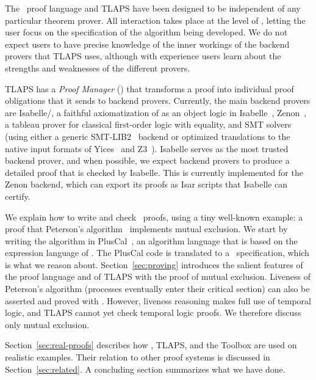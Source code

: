 \documentclass[a4paper,draft]{llncs}
\begin{document}
The \tlaplus\ proof language and TLAPS have been designed to be independent of
any particular theorem prover. All interaction takes place at the level of
\tlaplus, letting the user focus on the specification of the algorithm being
developed. We do not expect users to have precise knowledge of the inner
workings of the backend provers that TLAPS uses, although with experience users
learn about the strengths and weaknesses of the different provers.

TLAPS has a \emph{Proof Manager} (\PM) that transforms a proof into
individual proof obligations that it sends to backend provers.
Currently, the main backend provers are Isabelle/\tlaplus, a faithful
axiomatization of \tlaplus as an object logic in Isabelle~\cite{wenzel:isabelle},
Zenon~\cite{bonichon07lpar}, a tableau prover for classical
first-order logic with equality, and SMT solvers (using either a generic
SMT-LIB2~\cite{smtlib} backend or optimized translations to the native input
formats of Yices~\cite{yices} and Z3~\cite{z3}).
Isabelle serves as
the most trusted backend prover, and when possible, we expect backend provers to
produce a detailed proof that is checked by Isabelle. This is currently
implemented for the Zenon backend, which can export its proofs as Isar
scripts that Isabelle can certify.

We explain how to write and check \tlaplus\ proofs,
using a tiny well-known example: a proof that Peterson's
algorithm~\cite{peterson:myths} implements
mutual exclusion. We start by writing the algorithm in
PlusCal~\cite{lamport:pluscal}, an algorithm language that is based on the
expression language of \tlaplus. The PlusCal code is translated to a \tlaplus\
specification, which is what we reason about. Section~\ref{sec:proving}
introduces the salient features of the proof language and of TLAPS with the
proof of mutual exclusion. Liveness of Peterson's
algorithm (processes eventually enter their critical section) can also be
asserted and proved with \tlaplus. However, liveness reasoning makes full use of
temporal logic, and TLAPS cannot yet check temporal logic proofs. We therefore
discuss only mutual exclusion.

Section~\ref{sec:real-proofs} describes how \tlaplus, TLAPS, and the
Toolbox are used on realistic examples.  Their relation to other proof
systems is discussed in Section~\ref{sec:related}.  A concluding
section summarizes what we have done.
\end{document}
